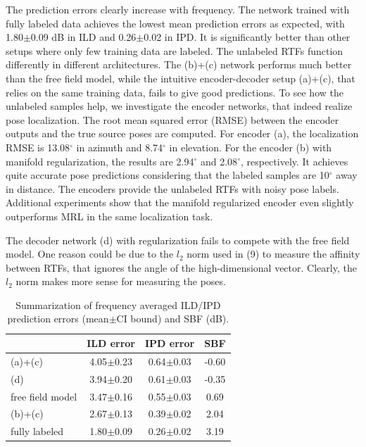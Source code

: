 \documentclass{article}
\begin{document}
The prediction errors clearly increase with frequency. The network trained with fully labeled data achieves the lowest mean prediction errors as expected, with 1.80$\pm$0.09 dB in ILD and 0.26$\pm$0.02 in IPD. It is significantly better than other setups where only few training data are labeled. The unlabeled RTFs function differently in different architectures. The (b)+(c) network performs much better than the free field model, while the intuitive encoder-decoder setup (a)+(c), that relies on the same training data, fails to give good predictions. To see how the unlabeled samples help, we investigate the encoder networks, that indeed realize pose localization. The root mean squared error (RMSE) between the encoder outputs and the true source poses are computed. For encoder (a), the localization RMSE is 13.08$^{\circ}$ in azimuth and 8.74$^{\circ}$ in elevation. For the encoder (b) with manifold regularization, the results are 2.94$^{\circ}$ and 2.08$^{\circ}$, respectively. It achieves quite accurate pose predictions considering that the labeled samples are 10$^{\circ}$ away in distance. The encoders provide the unlabeled RTFs with noisy pose labels. Additional experiments show that the manifold regularized encoder even slightly outperforms MRL in the same localization task.

The decoder network (d) with regularization fails to compete with the free field model. One reason could be due to the $l_2$ norm used in (9) to measure the affinity between RTFs, that ignores the angle of the high-dimensional vector. Clearly, the $l_2$ norm makes more sense for measuring the poses.

\begin{table}[tb]
\caption{Summarization of frequency averaged ILD/IPD prediction errors (mean$\pm$CI bound) and SBF (dB).}
\label{table:1}
\begin{center}
\begin{tabular}{|l|c|c||c|}
  \hline
                       & ILD error & IPD error & SBF \\ \hline
   (a)+(c)    & 4.05$\pm$0.23 & 0.64$\pm$0.03  &  -0.60\\ \hline
   (d)        & 3.94$\pm$0.20 & 0.61$\pm$0.03   &  -0.35\\ \hline
   free field model & 3.47$\pm$0.16 & 0.55$\pm$0.03 & 0.69\\ \hline
   (b)+(c)    & 2.67$\pm$0.13 & 0.39$\pm$0.02    &  2.04   \\ \hline
   fully labeled & 1.80$\pm$0.09 & 0.26$\pm$0.02 &  3.19 \\ \hline
\end{tabular}
\end{center}
\end{table}
\end{document}
